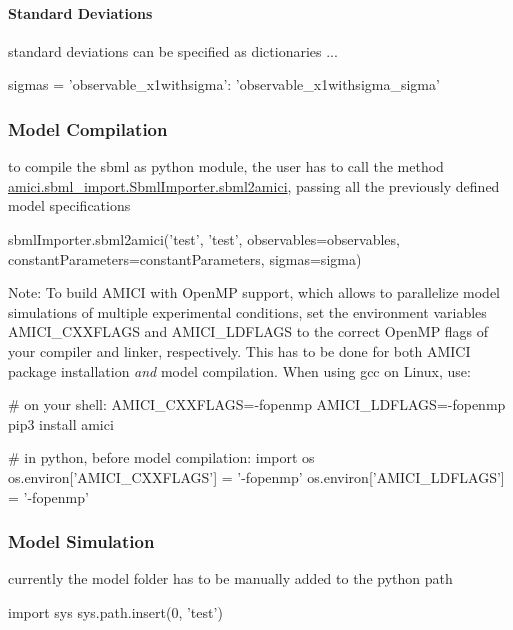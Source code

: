 \paragraph*{Standard Deviations}

standard deviations can be specified as dictionaries ... \begin{DoxyVerb}sigmas = {'observable_x1withsigma': 'observable_x1withsigma_sigma'}
\end{DoxyVerb}


\subsubsection*{Model Compilation}

to compile the sbml as python module, the user has to call the method {\ttfamily \mbox{\hyperlink{classamici_1_1sbml__import_1_1_sbml_importer_ab02f5c6e1bc803fe8223280ebb555a82}{amici.\+sbml\+\_\+import.\+Sbml\+Importer.\+sbml2amici}}}, passing all the previously defined model specifications \begin{DoxyVerb}sbmlImporter.sbml2amici('test', 'test', 
                        observables=observables,
                        constantParameters=constantParameters,
                        sigmas=sigma)
\end{DoxyVerb}


Note\+: To build A\+M\+I\+CI with Open\+MP support, which allows to parallelize model simulations of multiple experimental conditions, set the environment variables {\ttfamily A\+M\+I\+C\+I\+\_\+\+C\+X\+X\+F\+L\+A\+GS} and {\ttfamily A\+M\+I\+C\+I\+\_\+\+L\+D\+F\+L\+A\+GS} to the correct Open\+MP flags of your compiler and linker, respectively. This has to be done for both A\+M\+I\+CI package installation {\itshape and} model compilation. When using {\ttfamily gcc} on Linux, use\+: \begin{DoxyVerb}# on your shell:
AMICI_CXXFLAGS=-fopenmp AMICI_LDFLAGS=-fopenmp pip3 install amici

# in python, before model compilation:
import os
os.environ['AMICI_CXXFLAGS'] = '-fopenmp'
os.environ['AMICI_LDFLAGS'] = '-fopenmp'
\end{DoxyVerb}


\subsubsection*{Model Simulation}

currently the model folder has to be manually added to the python path \begin{DoxyVerb}import sys
sys.path.insert(0, 'test')
\end{DoxyVerb}


